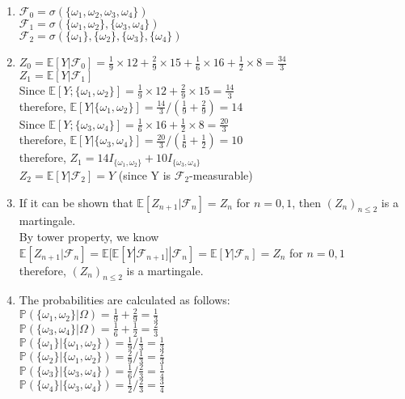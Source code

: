 \documentclass[a4paper, 12pt]{article}
\begin{document}
\begin{enumerate}[label=\alph*)]
	\item 
	$\mathcal{F}_0 = \sigma(\{\omega_1,\omega_2,\omega_3,\omega_4\})$ \\
	$\mathcal{F}_1 = \sigma(\{\omega_1,\omega_2\},\{\omega_3,\omega_4\})$ \\
	$\mathcal{F}_2 = \sigma(\{\omega_1\},\{\omega_2\},\{\omega_3\},\{\omega_4\})$
	
	\item 
	$Z_0 = \mathbb{E}[Y|\mathcal{F}_0] = \frac{1}{9}\times12+\frac{2}{9}\times15+\frac{1}{6}\times16+\frac{1}{2}\times8 = \frac{34}{3}$ \\
	$Z_1 = \mathbb{E}[Y|\mathcal{F}_1]$ \\
	Since $\mathbb{E}[Y;\{\omega_1,\omega_2\}] = \frac{1}{9}\times12+\frac{2}{9}\times15 = \frac{14}{3}$ \\ 
	therefore, $\mathbb{E}[Y|\{\omega_1,\omega_2\}] = \frac{14}{3}/(\frac{1}{9}+\frac{2}{9}) = 14$ \\
	Since $\mathbb{E}[Y;\{\omega_3,\omega_4\}] = \frac{1}{6}\times16+\frac{1}{2}\times8 = \frac{20}{3}$ \\
	therefore, $\mathbb{E}[Y|\{\omega_3,\omega_4\}] = \frac{20}{3}/(\frac{1}{6}+\frac{1}{2}) = 10$ \\
	therefore, $Z_1 = 14I_{\{\omega_1,\omega_2\}} + 10I_{\{\omega_3,\omega_4\}}$ \\
	$Z_2 = \mathbb{E}[Y|\mathcal{F}_2] = Y$ (since Y is $\mathcal{F}_2$-measurable)
	
	\item
	If it can be shown that $\mathbb{E}[Z_{n+1}|\mathcal{F}_n] = Z_n$ for $n=0,1$, then $(Z_n)_{n\leq2}$ is a martingale. \\
	By tower property, we know \\ $\mathbb{E}[Z_{n+1}|\mathcal{F}_n] = \mathbb{E}[\mathbb{E}[Y|\mathcal{F}_{n+1}]|\mathcal{F}_n] = \mathbb{E}[Y|\mathcal{F}_n] = Z_n$ for $n=0,1$ \\
	therefore, $(Z_n)_{n\leq2}$ is a martingale.
	
	\item 
	
	The probabilities are calculated as follows: \\
	$\mathbb{P}(\{\omega_1,\omega_2\}|\Omega) = \frac{1}{9} + \frac{2}{9} = \frac{1}{3}$ \\
	$\mathbb{P}(\{\omega_3,\omega_4\}|\Omega) = \frac{1}{6} + \frac{1}{2} = \frac{2}{3}$ \\
	$\mathbb{P}(\{\omega_1\}|\{\omega_1,\omega_2\}) = \frac{1}{9} / \frac{1}{3} = \frac{1}{3}$ \\
	$\mathbb{P}(\{\omega_2\}|\{\omega_1,\omega_2\}) = \frac{2}{9} / \frac{1}{3} = \frac{2}{3}$ \\
	$\mathbb{P}(\{\omega_3\}|\{\omega_3,\omega_4\}) = \frac{1}{6} / \frac{2}{3} = \frac{1}{4}$ \\
	$\mathbb{P}(\{\omega_4\}|\{\omega_3,\omega_4\}) = \frac{1}{2} / \frac{2}{3} = \frac{3}{4}$
	

\end{enumerate}
\end{document}
